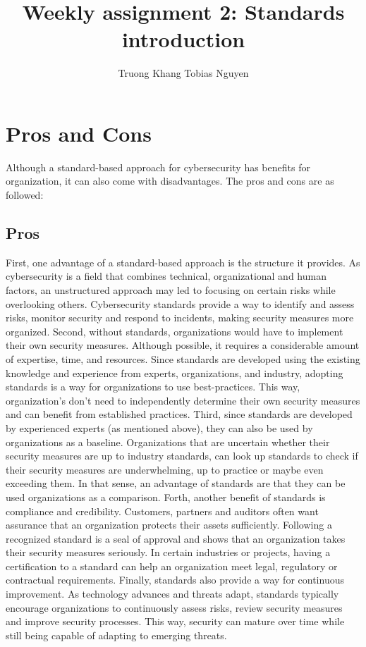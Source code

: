 \documentclass[12pt]{article}
\title{Weekly assignment 2: Standards introduction}
\author{Truong Khang Tobias Nguyen}
\date{}
\begin{document}
\maketitle

\section{Pros and Cons}
Although a standard-based approach for cybersecurity has benefits for organization, it can also come with disadvantages.
\newline
The pros and cons are as followed:
\subsection{Pros}
First, one advantage of a standard-based approach is the structure it provides. As cybersecurity is a field that combines technical, organizational and human factors, an unstructured approach may led to focusing on certain risks while overlooking others. Cybersecurity standards provide a way to identify and assess risks, monitor security and respond to incidents, making security measures more organized.
\newline
Second, without standards, organizations would have to implement their own security measures. Although possible, it requires a considerable amount of expertise, time, and resources. Since standards are developed using the existing knowledge and experience from experts, organizations, and industry, adopting standards is a way for organizations to use best-practices. This way, organization's don't need to independently determine their own security measures and can benefit from established practices.
\newline
Third, since standards are developed by experienced experts (as mentioned above), they can also be used by organizations as a baseline. Organizations that are uncertain whether their security measures are up to industry standards, can look up standards to check if their security measures are underwhelming, up to practice or maybe even exceeding them. In that sense, an advantage of standards are that they can be used organizations as a comparison.
\newline
Forth, another benefit of standards is compliance and credibility. Customers, partners and auditors often want assurance that an organization protects their assets sufficiently. Following a recognized standard is a seal of approval and shows that an organization takes their security measures seriously. In certain industries or projects, having a certification to a standard can help an organization meet legal, regulatory or contractual requirements.
\newline
Finally, standards also provide a way for continuous improvement. As technology advances and threats adapt, standards typically encourage organizations to continuously assess risks, review security measures and improve security processes. This way, security can mature over time while still being capable of adapting to emerging threats.
\end{document}
